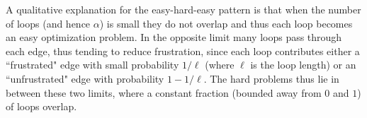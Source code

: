 A qualitative explanation for the easy-hard-easy pattern is that when the number of loops (and hence $\alpha$) is small they do not overlap and thus each loop becomes an easy optimization problem. In the opposite limit many loops pass through each edge, thus tending to reduce frustration, since each loop contributes either a ``frustrated" edge with small probability $1/\ell$ (where $\ell$ is the loop length) or an ``unfrustrated" edge with probability $1-1/\ell$.
The hard problems thus lie in between these two limits, where a constant fraction (bounded away from $0$ and $1$) of loops overlap.

\begin{figure}[t]
\\
\\

\end{figure}
